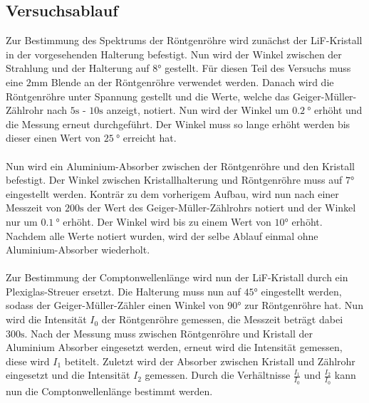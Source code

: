 \subsection{Versuchsablauf}
Zur Bestimmung des Spektrums der Röntgenröhre wird zunächst der LiF-Kristall in der vorgesehenden Halterung befestigt.
Nun wird der Winkel zwischen der Strahlung und der Halterung auf $8 \si{\degree}$ gestellt.
Für diesen Teil des Versuchs muss eine $2 \si{\milli\meter}$ Blende an der Röntgenröhre verwendet werden.
Danach wird die Röntgenröhre unter Spannung gestellt und die Werte, welche das Geiger-Müller-Zählrohr nach $5\si{\second}$ - $10\si{\second}$ anzeigt, notiert.
Nun wird der Winkel um $\SI{0.2}{\degree}$ erhöht und die Messung erneut durchgeführt.
Der Winkel muss so lange erhöht werden bis dieser einen Wert von $\SI{25}{\degree}$ erreicht hat.
\\\\
Nun wird ein Aluminium-Absorber zwischen der Röntgenröhre und den Kristall befestigt.
Der Winkel zwischen Kristallhalterung und Röntgenröhre muss auf $7\si{\degree}$ eingestellt werden.
Konträr zu dem vorherigem Aufbau, wird nun nach einer Messzeit von $200 \si{\second}$ der Wert des Geiger-Müller-Zählrohrs notiert und der Winkel nur um $\SI{0.1}{\degree}$ erhöht.
Der Winkel wird bis zu einem Wert von $10\si{\degree}$ erhöht.
Nachdem alle Werte notiert wurden, wird der selbe Ablauf einmal ohne Aluminium-Absorber wiederholt.
\\\\
Zur Bestimmung der Comptonwellenlänge wird nun der LiF-Kristall durch ein Plexiglas-Streuer ersetzt.
Die Halterung muss nun auf $45 \si{\degree}$ eingestellt werden, sodass der Geiger-Müller-Zähler einen Winkel von $90\si{\degree}$ zur Röntgenröhre hat.
Nun wird die Intensität $I_0$ der Röntgenröhre gemessen, die Messzeit beträgt dabei $300\si{\second}$.
Nach der Messung muss zwischen Röntgenröhre und Kristall der Aluminium Absorber eingesetzt werden, erneut wird die Intensität gemessen, diese wird $I_1$ betitelt.
Zuletzt wird der Absorber zwischen Kristall und Zählrohr eingesetzt und die Intensität $I_2$ gemessen.
Durch die Verhältnisse $\frac{I_1}{I_0}$ und $\frac{I_2}{I_0}$ kann nun die Comptonwellenlänge bestimmt werden.
